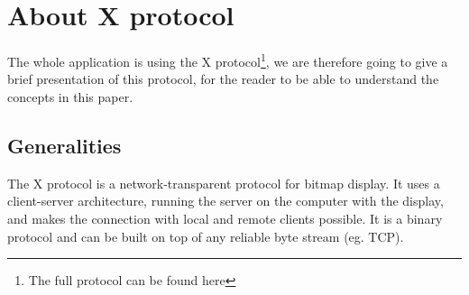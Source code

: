 \section{About X protocol}
The whole application is using the X protocol\footnote{The full protocol can be found here}, we are therefore going
to give a brief presentation of this protocol, for the reader to be able 
to understand the concepts in this paper.
\subsection{Generalities}
The X protocol is a network-transparent protocol for bitmap display. 
It uses a client-server architecture, running the server on the computer 
with the display, and makes the connection with local and remote clients possible. 
It is a binary protocol and can be built on top of any reliable byte stream (eg. TCP).

